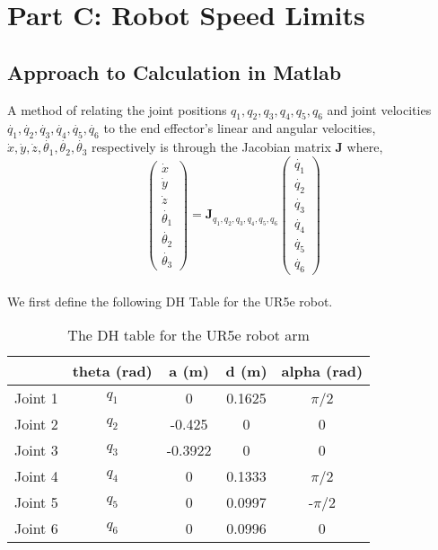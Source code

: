 \section{Part C: Robot Speed Limits}
\subsection{Approach to Calculation in Matlab}
A method of relating the joint positions $q_1,q_2,q_3,q_4,q_5,q_6$ and joint velocities $\dot{q_1},\dot{q_2},\dot{q_3},\dot{q_4},\dot{q_5},\dot{q_6}$ to the end effector's linear and angular velocities, $\dot{x},\dot{y},\dot{z},\dot{\theta_1},\dot{\theta_2},\dot{\theta_3}$ respectively is through the Jacobian matrix $\textbf{J}$ where,
\begin{equation*}
    \begin{pmatrix}\dot{x}\\\dot{y}\\\dot{z}\\\dot{\theta_1}\\\dot{\theta_2}\\\dot{\theta_3}\end{pmatrix} = \textbf{J}_{q_1, q_2, q_3, q_4, q_5, q_6} \begin{pmatrix}\dot{q_1}\\\dot{q_2}\\\dot{q_3}\\\dot{q_4}\\\dot{q_5}\\\dot{q_6}\end{pmatrix}
\end{equation*}
\\ We first define the following DH Table for the UR5e robot.
\begin{table}[H]
    \centering
    \begin{tabular}{|c|c|c|c|c|}
        \hline
                & \textbf{theta (rad)} & \textbf{a (m)} & \textbf{d (m)} & \textbf{alpha (rad)} \\ \hline
        Joint 1 & $q_1$                & 0              & 0.1625         & $\pi$/2              \\ \hline
        Joint 2 & $q_2$                & -0.425         & 0              & 0                    \\ \hline
        Joint 3 & $q_3$                & -0.3922        & 0              & 0                    \\ \hline
        Joint 4 & $q_4$                & 0              & 0.1333         & $\pi$/2              \\ \hline
        Joint 5 & $q_5$                & 0              & 0.0997         & -$\pi$/2             \\ \hline
        Joint 6 & $q_6$                & 0              & 0.0996         & 0                    \\ \hline
    \end{tabular}
    \caption{The DH table for the UR5e robot arm}
    \label{table:DH-UR5e part C}
\end{table}
